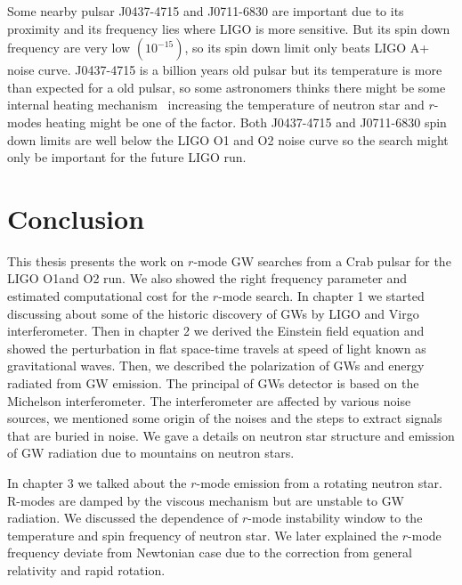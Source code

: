 \documentclass{ttuthes2007}
\begin{document}
Some nearby pulsar J0437-4715 and J0711-6830 are important due to its proximity
and its frequency lies where \ac{LIGO} is more sensitive. But its spin down
frequency are very low $(10^{-15})$, so its spin down limit only beats LIGO A+
noise curve. J0437-4715 is a billion years old pulsar but its temperature is
more than expected for a old pulsar, so some astronomers thinks there might be
some internal heating mechanism~\cite{Durant_2012} increasing the temperature of
neutron star and $r$-modes heating might be one of the factor. Both J0437-4715
and J0711-6830 spin down limits are well below the LIGO \ac{O1} and \ac{O2}
noise curve so the search might only be important for the future LIGO run.  





\chapter{\textbf{Conclusion}}
This thesis presents the work on $r$-mode \ac{GW} searches from a Crab pulsar
for the \ac{LIGO} \ac{O1}and \ac{O2} run. We also showed the right frequency
parameter and estimated computational cost for the $r$-mode search. In chapter 1
we started discussing about some of the historic discovery of \acp{GW} by
\ac{LIGO} and Virgo interferometer. Then in chapter 2 we derived the Einstein
field equation and showed the perturbation in flat space-time travels at speed
of light known as gravitational waves. Then, we described the polarization of
\acp{GW} and energy radiated from \ac{GW} emission.  The principal of \acp{GW}
detector is based on the Michelson interferometer. The interferometer are
affected by various noise sources, we mentioned some origin of the noises and
the steps to extract signals that are buried in noise. We gave a details on
neutron star structure and emission of \ac{GW} radiation due to mountains on
neutron stars.

In chapter 3 we talked about the $r$-mode emission from a rotating neutron star.
R-modes are damped by the viscous mechanism but are unstable to \ac{GW}
radiation. We discussed the dependence of $r$-mode
instability window to the temperature and spin frequency of neutron star. We
later explained the $r$-mode frequency deviate from Newtonian case due to the
correction from general relativity and rapid rotation. 
\end{document}
